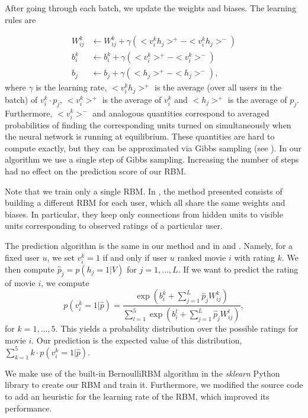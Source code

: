 \documentclass[10pt,conference,compsocconf]{IEEEtran}
\begin{document}
	After going through each batch, we update the weights and biases. The learning rules are
	
	\begin{equation}
	\begin{split}
	W^k_{ij} &\leftarrow W^k_{ij} + \gamma(<v^k_ih_j>^+-<v^k_ih_j>^-)\\
	b^k_i &\leftarrow b^k_i + \gamma(<v^k_i>^+-<v^k_i>^-)\\
	b_j &\leftarrow b_j + \gamma(<h_j>^+-<h_j>^-),
	\end{split}
	\end{equation}
	where $\gamma$ is the learning rate, $<v^k_ih_j>^+$ is the average (over all users in the batch) of $v^k_i\cdot p_j$, $<v^k_i>^+$ is the average of $v^k_i$ and $<h_j>^+$ is the average of $p_j$. Furthermore, $<v^k_i>^-$ and analogous quantities correspond to averaged probabilities of finding the corresponding units turned on simultaneously  when the neural network is running at equilibrium. These quantities are hard to compute exactly, but they can be approximated via Gibbs sampling (see \cite{H02}). In our algorithm we use a single step of Gibbs sampling. Increasing the number of steps had no effect on the prediction score of our RBM.
	
	Note that we train only a single RBM. In \cite{SMH07}, the method presented consists of building a different RBM for each user, which all share the same weights and biases. In particular, they keep only connections from hidden units to visible units corresponding to observed ratings of a particular user.
	
	The prediction algorithm is the same in our method and in \cite{SMH07} and \cite{L10}. Namely, for a fixed user $u$, we set $v^k_i=1$ if and only if user $u$ ranked movie $i$ with rating $k$. We then compute $\hat{p}_j=p(h_j=1|V)$ for $j=1,\dots, L$. If we want to predict the rating of movie $i$, we compute
	\begin{equation}
	p(v^k_i=1|\hat{p})=\frac{\exp(b^k_i+\sum_{j=1}^L \hat{p}_jW^k_{ij})}{\sum_{l=1}^{5}\exp(b^l_i+\sum_{j=1}^{L}\hat{p}_jW^l_{ij})},
	\end{equation}
	for $k=1,\dots, 5$. This yields a probability distribution over the possible ratings for movie $i$. Our prediction is the expected value of this distribution, $\sum_{k=1}^{5}k\cdot p(v^k_i=1|\hat{p})$.
	
	We make use of the built-in BernoulliRBM algorithm in the \textit{sklearn} Python library to create our RBM and train it. Furthermore, we modified the source code to add an heuristic for the learning rate of the RBM, which improved its performance.
	
\end{document}
